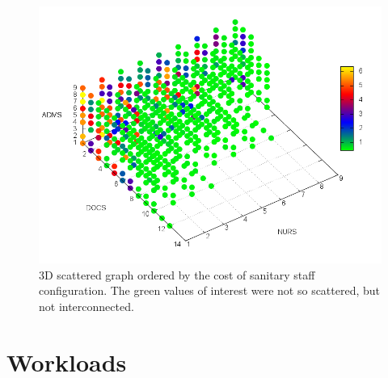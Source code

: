 


\begin{figure}[h]
\noindent \begin{centering}
\includegraphics[width=0.88\columnwidth,height=0.2\paperheight]{figs4/3D-scatter-LoS-$2}
\par\end{centering}

\caption{3D scattered graph ordered by the cost of sanitary staff configuration.
The green values of interest were not so scattered, but not interconnected.\label{fig:3D-scattered-LoS-cost} }


\end{figure}



\section{Workloads}

